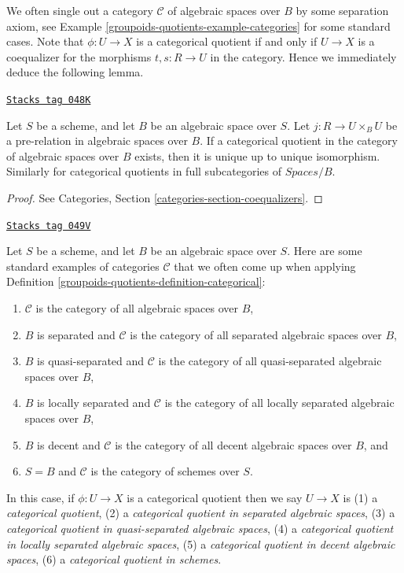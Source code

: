 We often single out a category $\mathcal{C}$ of algebraic spaces over $B$
by some separation axiom, see
Example \ref{groupoids-quotients-example-categories}
for some standard cases.
Note that $\phi : U \to X$ is a categorical quotient if and only
if $U \to X$ is a coequalizer for the
morphisms $t, s : R \to U$ in the category. Hence we immediately
deduce the following lemma.

\begin{lemma}
\label{groupoids-quotients-lemma-categorical-unique}
\href{https://stacks.math.columbia.edu/tag/048K}{\texttt{Stacks tag 048K}}

Let $S$ be a scheme, and let $B$ be an algebraic space over $S$.
Let $j : R \to U \times_B U$ be a pre-relation in algebraic spaces over $B$.
If a categorical quotient in the category of algebraic spaces
over $B$ exists, then it is unique up to unique isomorphism.
Similarly for categorical quotients in full subcategories of
$\textit{Spaces}/B$.
\end{lemma}

\begin{proof}
See Categories, Section \ref{categories-section-coequalizers}.
\end{proof}

\begin{example}[Categories]
\label{groupoids-quotients-example-categories}
\href{https://stacks.math.columbia.edu/tag/049V}{\texttt{Stacks tag 049V}}

Let $S$ be a scheme, and let $B$ be an algebraic space over $S$.
Here are some standard examples of categories $\mathcal{C}$
that we often come up when applying
Definition \ref{groupoids-quotients-definition-categorical}:
\begin{enumerate}
\item $\mathcal{C}$ is the category of all algebraic spaces over $B$,
\item $B$ is separated and $\mathcal{C}$ is the category of all separated
algebraic spaces over $B$,
\item $B$ is quasi-separated and $\mathcal{C}$ is the category of all
quasi-separated algebraic spaces over $B$,
\item $B$ is locally separated and $\mathcal{C}$ is the category of all
locally separated algebraic spaces over $B$,
\item $B$ is decent and $\mathcal{C}$ is the category of all decent algebraic
spaces over $B$, and
\item $S = B$ and $\mathcal{C}$ is the category of schemes over $S$.
\end{enumerate}
In this case, if $\phi : U \to X$ is a categorical quotient then we say
$U \to X$ is
(1) a {\it categorical quotient},
(2) a {\it categorical quotient in separated algebraic spaces},
(3) a {\it categorical quotient in quasi-separated algebraic spaces},
(4) a {\it categorical quotient in locally separated algebraic spaces},
(5) a {\it categorical quotient in decent algebraic spaces},
(6) a {\it categorical quotient in schemes}.
\end{example}

